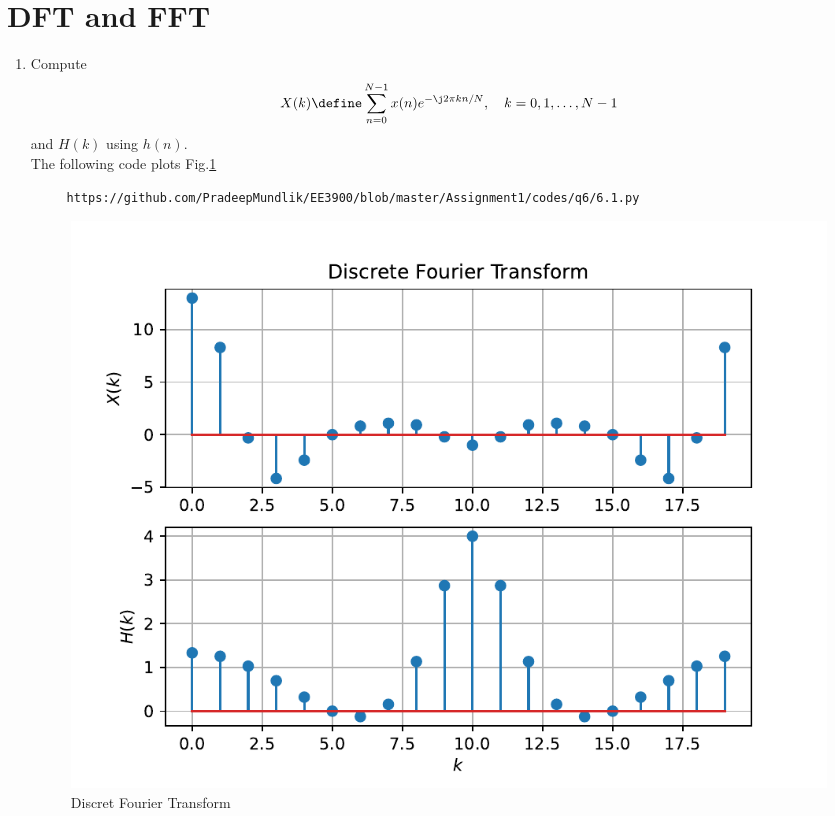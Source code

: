 \documentclass[journal,12pt,twocolumn]{IEEEtran}
\renewcommand\thesection{\arabic{section}}
\begin{document}
\section{DFT and FFT}
\begin{enumerate}[label=\thesection.\arabic*]
\item
Compute
\begin{equation}
X(k) \define \sum _{n=0}^{N-1}x(n) e^{-\j2\pi kn/N}, \quad k = 0,1,\dots, N-1
\end{equation}
and $H(k)$ using $h(n)$. \\
\solution
The following code plots Fig.\ref{fig:6.1} 
\begin{lstlisting}
     https://github.com/PradeepMundlik/EE3900/blob/master/Assignment1/codes/q6/6.1.py
\end{lstlisting}
\begin{figure}[!ht]
     \centering
     \includegraphics[width=\columnwidth]{figs/q6/6.1.pdf}
     \caption{Discret Fourier Transform}
     \label{fig:6.1}
\end{figure}


\end{enumerate}
\end{document}
